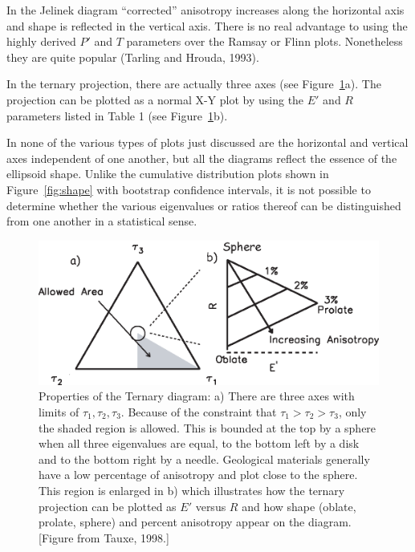    In the  Jelinek diagram  ``corrected'' anisotropy increases along the horizontal axis and shape is
reflected in the vertical axis.  There is no real advantage to using the highly
derived $P'$ and $T$ parameters over the Ramsay or Flinn plots.  Nonetheless
they are quite popular
 (Tarling and Hrouda, 1993).  \nocite{tarling93}


In the ternary
projection, there are actually three axes (see Figure~\ref{fig:tern1}a).
The projection can be plotted  as a normal X-Y plot by using the $E'$ and
$R$ parameters listed in Table 1 (see Figure~\ref{fig:tern1}b).

  In none of the various types of  plots  just discussed are the
horizontal and vertical axes independent of one another, but all the
diagrams reflect the essence of the ellipsoid shape.  
Unlike the cumulative distribution plots shown in Figure~\ref{fig:shape} with bootstrap confidence intervals,
it is not possible to determine whether the
various eigenvalues or ratios thereof can be distinguished from one another
 in a statistical sense.

\begin{figure}[htb]
\centering  \includegraphics[width=12 cm]{EPSfiles/ternaryams.eps}
\caption{Properties of the Ternary diagram: a) There are three axes
with limits of $\tau_1,\tau_2, \tau_3$.  Because of the constraint that
$\tau_1>\tau_2>\tau_3$, only the shaded region is allowed. This is
bounded at the top by a sphere when all three eigenvalues are equal, to
the bottom left by a disk and to the bottom right by a
needle.  Geological materials generally have a low percentage of anisotropy
and plot close to the sphere.  This region is enlarged in b) which
illustrates how the ternary projection can be plotted as $E'$ versus
$R$ and how  shape (oblate, prolate, sphere) and 
percent anisotropy appear on the diagram. [Figure from Tauxe, 1998.] }
\label{fig:tern1}
\end{figure}


